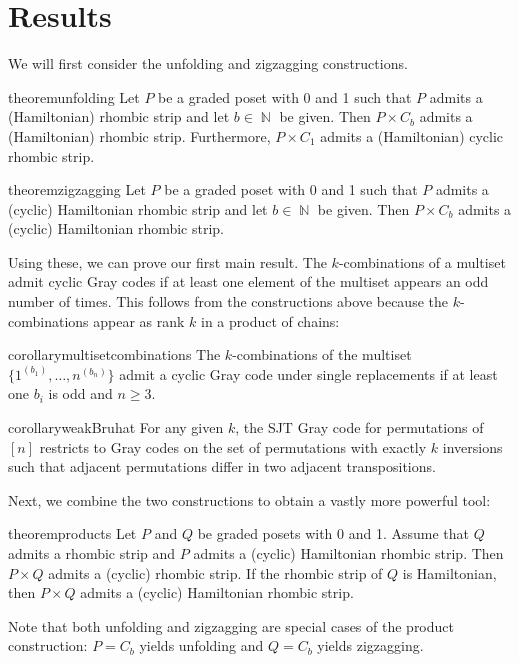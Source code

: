 \documentclass[fontsize=11pt,a4paper,DIV=12]{scrartcl}
\DeclareMathOperator{\N}{\mathbb{N}}
\begin{document}
\section{Results}\label{sec:results}

We will first consider the unfolding and zigzagging constructions.

\begin{restatable}[Unfolding]{theorem}{unfolding}\label{thm:unfolding}
    Let $P$ be a graded poset with 0 and 1 such that $P$ admits a (Hamiltonian) rhombic strip and let $b\in\N$ be given. Then $P\times C_b$ admits a (Hamiltonian) rhombic strip. Furthermore, $P\times C_{1}$ admits a (Hamiltonian) cyclic rhombic strip.
\end{restatable}

\begin{restatable}[Zigzagging]{theorem}{zigzagging}\label{thm:zigzagging}
    Let $P$ be a graded poset with 0 and 1 such that $P$ admits a (cyclic) Hamiltonian rhombic strip and let $b\in\N$ be given. Then $P\times C_b$ admits a (cyclic) Hamiltonian rhombic strip.
\end{restatable}

Using these, we can prove our first main result. The $k$-combinations of a multiset admit cyclic Gray codes if at least one element of the multiset appears an odd number of times. This follows from the constructions above because the $k$-combinations appear as rank $k$ in a product of chains:

\begin{restatable}{corollary}{multisetcombinations}\label{thm:multiset combinations}
    The $k$-combinations of the multiset $\{1^{(b_1)},\ldots,n^{(b_n)}\}$ admit a cyclic Gray code under single replacements if at least one $b_i$ is odd and $n\ge 3$.
\end{restatable}

\begin{restatable}{corollary}{weakBruhat}\label{thm:bruhat}
    For any given $k$, the SJT Gray code for permutations of $[n]$ restricts to Gray codes on the set of permutations with exactly $k$ inversions such that adjacent permutations differ in two adjacent transpositions.
\end{restatable}

Next, we combine the two constructions to obtain a vastly more powerful tool:

\begin{restatable}{theorem}{products}\label{thm:products}
    Let $P$ and $Q$ be graded posets with 0 and 1. Assume that $Q$ admits a rhombic strip and $P$ admits a (cyclic) Hamiltonian rhombic strip. Then $P\times Q$ admits a (cyclic) rhombic strip. If the rhombic strip of $Q$ is Hamiltonian, then $P\times Q$ admits a (cyclic) Hamiltonian rhombic strip.
\end{restatable}
Note that both unfolding and zigzagging are special cases of the product construction: $P=C_b$ yields unfolding and $Q=C_b$ yields zigzagging.
\end{document}
